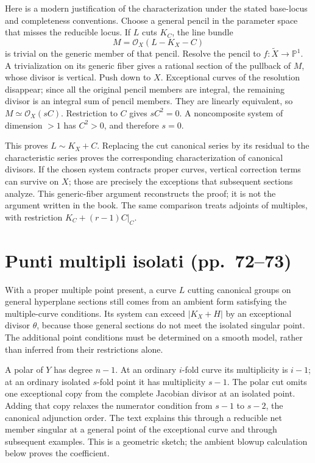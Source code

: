 Here is a modern justification of the characterization under the stated base-locus and completeness conventions. Choose a general pencil in the parameter space that misses the reducible locus. If \(L\) cuts \(K_C\), the line bundle \[
M=\mathcal O_X(L-K_X-C)
\] is trivial on the generic member of that pencil. Resolve the pencil to \(f:\widetilde X\to\mathbb{P}^1\). A trivialization on its generic fiber gives a rational section of the pullback of \(M\), whose divisor is vertical. Push down to \(X\). Exceptional curves of the resolution disappear; since all the original pencil members are integral, the remaining divisor is an integral sum of pencil members. They are linearly equivalent, so \(M\simeq\mathcal O_X(sC)\). Restriction to \(C\) gives \(sC^2=0\). A noncomposite system of dimension \(>1\) has \(C^2>0\), and therefore \(s=0\).

This proves \(L\sim K_X+C\). Replacing the cut canonical series by its residual to the characteristic series proves the corresponding characterization of canonical divisors. If the chosen system contracts proper curves, vertical correction terms can survive on \(X\); those are precisely the exceptions that subsequent sections analyze. This generic-fiber argument reconstructs the proof; it is not the argument written in the book. The same comparison treats adjoints of multiples, with restriction \(K_C+(r-1)C|_C\).

\section[Punti multipli isolati]{Punti multipli isolati (pp.~72--73)}\label{commentary-III-5}

With a proper multiple point present, a curve \(L\) cutting canonical groups on general hyperplane sections still comes from an ambient form satisfying the multiple-curve conditions. Its system can exceed \(|K_X+H|\) by an exceptional divisor \(\theta\), because those general sections do not meet the isolated singular point. The additional point conditions must be determined on a smooth model, rather than inferred from their restrictions alone.

A polar of \(Y\) has degree \(n-1\). At an ordinary \(i\)-fold curve its multiplicity is \(i-1\); at an ordinary isolated \(s\)-fold point it has multiplicity \(s-1\). The polar cut omits one exceptional copy from the complete Jacobian divisor at an isolated point. Adding that copy relaxes the numerator condition from \(s-1\) to \(s-2\), the canonical adjunction order. The text explains this through a reducible net member singular at a general point of the exceptional curve and through subsequent examples. This is a geometric sketch; the ambient blowup calculation below proves the coefficient.

